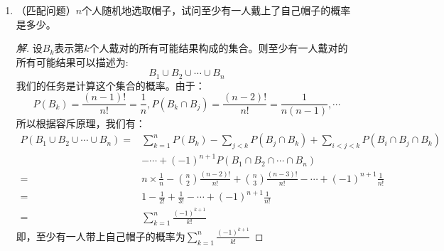 \documentclass[12pt]{article}
\newcommand{\hei}{\CJKfamily{hei}}                          %
\begin{document}
\begin{enumerate}
\item {\hei （匹配问题）$n$个人随机地选取帽子，试问至少有一人戴上了自己帽子的概率是多少。}
\begin{proof}[解]
	设$B_k$表示第$k$个人戴对的所有可能结果构成的集合。则至少有一人戴对的所有可能结果可以描述为:
	\begin{equation}
	B_1\cup B_2\cup\cdots\cup B_n
	\end{equation}
	我们的任务是计算这个集合的概率。由于：
	\begin{equation}
	P(B_k)=\frac{(n-1)!}{n!}=\frac{1}{n},P(B_k\cap B_j)=\frac{(n-2)!}{n!}=\frac{1}{n(n-1)},\cdots
	\end{equation}
	所以根据容斥原理，我们有：
	\begin{equation}
	\begin{aligned}
	P(B_1\cup B_2\cup\cdots\cup B_n)=&\sum_{k=1}^{n}P(B_k)-\sum_{j<k}P(B_j\cap B_k)+\sum_{i<j<k}P(B_i\cap B_j\cap B_k) \\
	&-\cdots+(-1)^{n+1}P(B_1\cap B_2\cap \cdots \cap B_n) \\
	=&n\times\frac{1}{n}-\binom{n}{2}\frac{(n-2)!}{n!}+\binom{n}{3}\frac{(n-3)!}{n!}-\cdots+(-1)^{n+1}\frac{1}{n!} \\
	=&1-\frac{1}{2!}+\frac{1}{3!}-\cdots+(-1)^{n+1}\frac{1}{n!} \\
	=&\sum_{k=1}^{n}\frac{(-1)^{k+1}}{k!}
	\end{aligned}
	\end{equation}
	即，至少有一人带上自己帽子的概率为$\sum_{k=1}^{n}\frac{(-1)^{k+1}}{k!}$
\end{proof}


\end{enumerate}
\end{document}
